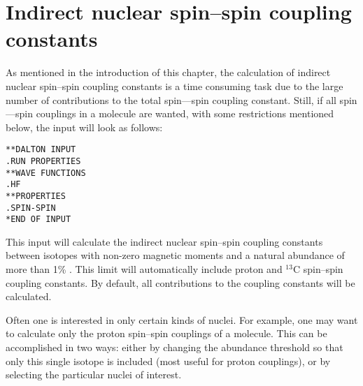 \section{Indirect nuclear spin--spin coupling
constants}\label{sec:spinspin}

\begin{center}
\end{center}

As mentioned in the introduction of this chapter, the calculation of
indirect nuclear
spin--spin coupling constants is a time consuming task due to the
large number of contributions to the total spin---spin coupling
constant. Still, if all spin---spin couplings in a molecule are wanted,
with some restrictions mentioned below, the input will look as
follows:

\begin{verbatim}
**DALTON INPUT
.RUN PROPERTIES
**WAVE FUNCTIONS
.HF
**PROPERTIES
.SPIN-SPIN
*END OF INPUT
\end{verbatim}

This input will calculate the indirect nuclear spin--spin
coupling
constants between isotopes with non-zero magnetic
moments and a
natural abundance of more than 1\% . This limit will
automatically
include proton and $^{13}$C spin--spin coupling constants. By default,
all contributions to the coupling constants will be calculated.

Often one is interested in only certain kinds of nuclei. For example,
 one may want to calculate only the proton spin--spin couplings of a molecule.
This can be accomplished in two ways: either by changing the abundance
threshold so that only this single isotope is included (most useful
for proton couplings), or by selecting the particular nuclei of interest.

